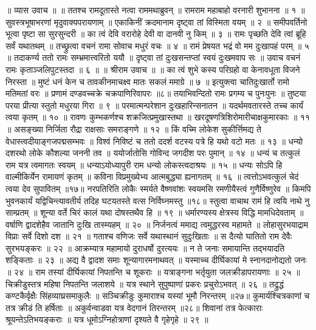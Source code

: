॥ व्यास उवाच ॥ ॥
ततश्च रामदूतास्ते नत्वा राममथाब्रुवन् ॥
रामराम महाबाहो वरनारी शुभानना ॥ १ ॥
सुवस्त्रभूषाभरणां मृदुवाक्यपरायणाम् ॥
एकाकिनीं क्रदमानाम दृष्ट्वा तां विस्मिता वयम् ॥ २ ॥
समीपवर्तिनो भूत्वा पृष्टा सा सुरसुन्दरी ॥
का त्वं देवि वरारोहे देवी वा दानवी नु किम् ॥ ३ ॥
रामः पृच्छति देवि त्वां ब्रूहि सर्वं यथातथम् ॥
तच्छ्रुत्वा वचनं रामा सोवाच मधुरं वचः ॥ ४ ॥
रामं प्रेषयत भद्रं वो मम दुःखापहं परम् ॥ ५ ॥
तदाकर्ण्य ततो रामः सम्भ्रमात्त्वरितो ययौ ॥
दृष्ट्वा तां दुःखसन्तप्तां स्वयं दुःखमवाप सः ॥
उवाच वचनं रामः कृताञ्जलिपुटस्तदा ॥ ६ ॥
॥ श्रीराम उवाच ॥ ॥
का त्वं शुभे कस्य परिग्रहो वा केनावधूता विजने निरस्ता ॥
मुष्टं धनं केन च तावकीनमाचक्ष्व मातः सकलं ममाग्रे ॥ ७ ॥
इत्युक्त्वा चातिदुःखार्तो रामो मतिमतां वरः ॥
प्रणामं दण्डवच्चक्रे चक्रपाणिरिवापरः ॥८॥
तयाभिवन्दितो रामः प्रगम्य च पुनःपुनः ॥
तुष्टया परया प्रीत्या स्तुतो मधुरया गिरा ॥ ९ ॥
परमात्मन्परेशान दुःखहारिन्सनातन ॥
यदर्थमवतारस्ते तच्च कार्यं त्वया कृतम् ॥ १० ॥
रावणः कुम्भकर्णश्च शक्रजित्प्रमुखास्तथा ॥
खरदूषणत्रिशिरोमारीचाक्षकुमारकाः ॥ ११ ॥
असङ्ख्या निर्जिता रौद्रा राक्षसाः समराङ्गणे ॥ १२ ॥
किं वच्मि लोकेश सुकीर्त्तिमद्य ते वेधास्त्वदीयाङ्गजपद्मसम्भवः ॥
विश्वं निविष्टं च ततो ददर्श वटस्य पत्रे हि यथो वटो मतः ॥ १३ ॥
धन्यो दशरथो लोके कौशल्या जननी तव ॥
ययोर्जातोसि गोविन्द जगदीश परः पुमान् ॥ १४ ॥
धन्यं च तत्कुलं राम यत्र त्वमागतः स्वयम् ॥
धन्याऽयोध्यापुरी राम धन्यो लोकस्त्वदाश्रयः ॥ १५ ॥
धन्यः सोऽपि हि वाल्मीकिर्येन रामायणं कृतम् ॥
कविना विप्रमुख्येभ्य आत्मबुद्ध्या ह्यनागतम् ॥ १६ ॥
त्वत्तोऽभवत्कुलं चेदं त्वया देव सुपावितम् ॥१७॥
नरपतिरिति लोकैः स्मर्यते वैष्णवांशः स्वयमसि रमणीयैस्त्वं गुणैर्विष्णुरेव ॥
किमपि भुवनकार्यं यद्विचिन्त्यावतीर्य तदिह घटयतस्ते वत्स निर्विघ्नमस्तु ॥१८॥
स्तुत्वा वाचाथ रामं हि त्वयि नाथे नु साम्प्रतम् ॥
शून्या वर्ते चिरं कालं यथा दोषस्तथैव हि ॥ १९ ॥
धर्मारण्यस्य क्षेत्रस्य विद्धि मामधिदेवताम् ॥
वर्षाणि द्वादशेहैव जातानि दुःखि तास्म्यहम् ॥ २० ॥
निर्जनत्वं ममाद्य त्वमुद्धरस्व महामते ॥
लोहासुरभयाद्राम विप्राः सर्वे दिशो दश ॥ २१ ॥
गताश्च वणिजः सर्वे यथास्थानं सुदुःखिताः ॥
स दैत्यो घातितो राम देवैः सुरभयङ्करः ॥ २२ ॥
आक्रम्यात्र महामायो दुराधर्षो दुरत्ययः ॥
न ते जनाः समायान्ति तद्भयादति शङ्किताः ॥ २३ ॥
अद्य वै द्वादश समाः शून्यागारमनाथवत् ॥
यस्माच्च दीर्घिकायां मे स्नानदानोद्यतो जनः ॥ २४ ॥
राम तस्यां दीर्घिकायां निपतन्ति च शूकराः ॥
यत्राङ्गना भर्तृयुता जलक्रीडापरायणाः ॥ २५ ॥
चिक्रीडुस्तत्र महिषा निपतन्ति जलाशये ॥
यत्र स्थाने सुपुष्पाणां प्रकरः प्रचुरोऽभवत् ॥ २६ ॥
तद्रुद्धं कण्टकैर्वृक्षैः सिंहव्याघ्रसमाकुलैः ॥
सञ्चिक्रीडुः कुमाराश्च यस्यां भूमौ निरन्तरम् ॥२७॥
कुमार्यश्चित्रकाणां च तत्र क्रीडं ति हर्षिताः ॥
अकुर्वन्वाडवा यत्र वेदगानं तिरन्तरम् ॥२८॥
शिवानां तत्र फेत्काराः श्रूयन्तेऽतिभयङ्कराः ॥
यत्र धूमोऽग्निहोत्राणां दृश्यते वै गृहेगृहे ॥ २९ ॥
